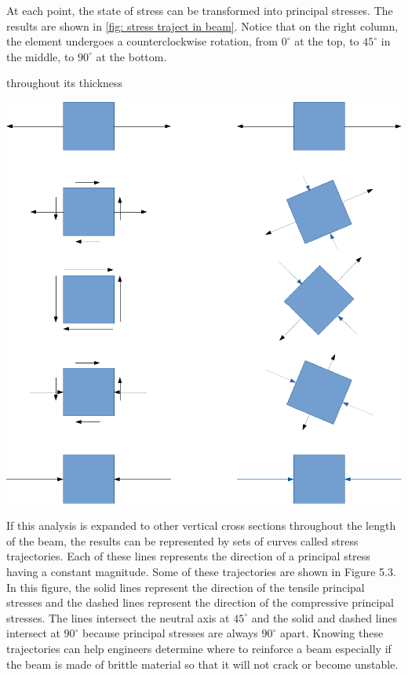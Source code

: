 \documentclass[a4paper,openany,12pt]{book}
\begin{document}
{{At each point, the state of stress can be transformed into principal
stresses. The results are shown in
\ref{fig: stress traject in beam}. Notice
that on the right column, the element undergoes a counterclockwise
rotation, from \(0^{\circ}\) at the top, to \(45^{\circ}\) in the middle, to
\(90^{\circ}\) at the bottom.


throughout its thickness
\begin{center}
\includegraphics[width=.9\linewidth]{pictures/Simple-load-bearing/stress-traject-beam.pdf}
\label{fig: stress traject in beam}
\end{center}

If this analysis is expanded to other vertical cross sections throughout
the length of the beam, the results can be represented by sets of curves
called stress trajectories. Each of these lines represents the direction
of a principal stress having a constant magnitude. Some of these
trajectories are shown in Figure 5.3. In this figure, the solid lines
represent the direction of the tensile principal stresses and the dashed
lines represent the direction of the compressive principal stresses. The
lines intersect the neutral axis at \(45^{\circ}\) and the solid and dashed
lines intersect at \(90^{\circ}\) because principal stresses are always
\(90^{\circ}\) apart. Knowing these trajectories can help engineers
determine where to reinforce a beam especially if the beam is made of
brittle material so that it will not crack or become unstable.

}}
\end{document}
